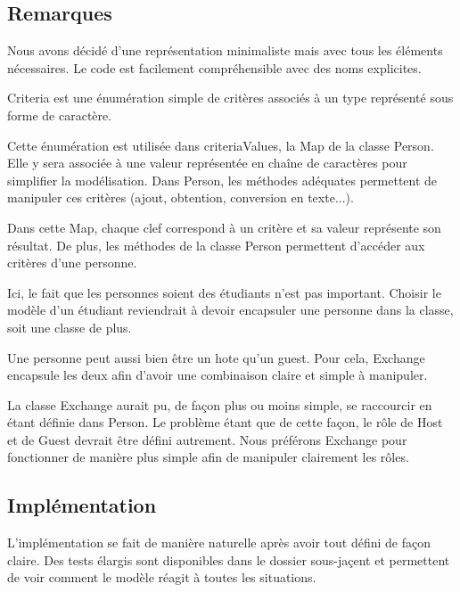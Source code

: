\documentclass{mytex}
\begin{document}

\subsection{Remarques}

Nous avons décidé d'une représentation minimaliste mais avec tous les éléments nécessaires.
Le code est facilement compréhensible avec des noms explicites.


Criteria est une énumération simple de critères associés à un type représenté sous forme de caractère.

Cette énumération est utilisée dans criteriaValues, la Map de la classe Person. Elle y sera associée à une valeur représentée en chaîne de caractères pour simplifier la modélisation. Dans Person, les méthodes adéquates permettent de manipuler ces critères (ajout, obtention, conversion en texte...).

Dans cette Map, chaque clef correspond à un critère et sa valeur représente son résultat. De plus, les méthodes de la classe Person permettent d'accéder aux critères d'une personne.


Ici, le fait que les personnes soient des étudiants n'est pas important.
Choisir le modèle d'un étudiant reviendrait à devoir encapsuler une personne dans la classe, soit une classe de plus.


Une personne peut aussi bien être un hote qu'un guest.
Pour cela, Exchange encapsule les deux afin d'avoir une combinaison claire et simple à manipuler.


La classe Exchange aurait pu, de façon plus ou moins simple, se raccourcir en étant définie dans Person.
Le problème étant que de cette façon, le rôle de Host et de Guest devrait être défini autrement. Nous préférons Exchange pour fonctionner de manière plus simple afin de manipuler clairement les rôles.

\subsection{Implémentation}

L'implémentation se fait de manière naturelle après avoir tout défini de façon claire.
Des tests élargis sont disponibles dans le dossier sous-jaçent et permettent de voir comment le modèle réagit à toutes les situations.
\end{document}

